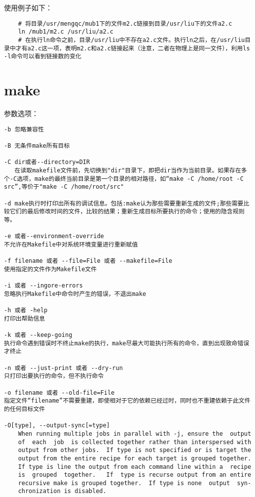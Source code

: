 \documentclass[a4paper,left=2.5cm,right=2.5cm,11pt]{article}
\begin{document}
	使用例子如下：
	\begin{lstlisting}
	# 将目录/usr/mengqc/mub1下的文件m2.c链接到目录/usr/liu下的文件a2.c
	ln /mub1/m2.c /usr/liu/a2.c
	# 在执行ln命令之前，目录/usr/liu中不存在a2.c文件。执行ln之后，在/usr/liu目录中才有a2.c这一项，表明m2.c和a2.c链接起来（注意，二者在物理上是同一文件），利用ls -l命令可以看到链接数的变化
	\end{lstlisting}

\section{make}
	参数选项：
	\begin{lstlisting}
-b 忽略兼容性 

-B 无条件make所有目标 

-C dir或者--directory=DIR 
   在读取makefile文件前，先切换到"dir"目录下，即把dir当作为当前目录。如果存在多个-C选项，make的最终当前目录是第一个目录的相对路径，如“make -C /home/root -C src”,等价于"make -C /home/root/src" 

-d make执行时打印出所有的调试信息。包括:make认为那些需要重新生成的文件;那些需要比较它们的最后修改时间的文件，比较的结果；重新生成目标所要执行的命令；使用的隐含规则等。 

-e 或者--environment-override 
不允许在Makefile中对系统环境变量进行重新赋值 

-f filename 或者 --file=File 或者 --makefile=File 
使用指定的文件作为Makefile文件 

-i 或者 --ingore-errors 
忽略执行Makefile中命令时产生的错误，不退出make 

-h 或者 -help 
打印出帮助信息 

-k 或者 --keep-going 
执行命令遇到错误时不终止make的执行，make尽最大可能执行所有的命令，直到出现致命错误才终止 

-n 或者 --just-print 或者 --dry-run 
只打印出要执行的命令，但不执行命令 

-o filename 或者 --old-file=File 
指定文件“filename”不需要重建，即使相对于它的依赖已经过时，同时也不重建依赖于此文件的任何目标文件 

-O[type], --output-sync[=type]
	When running multiple jobs in parallel with -j, ensure the  output
	of  each  job  is collected together rather than interspersed with
	output from other jobs.  If type is not specified or is target the
	output from the entire recipe for each target is grouped together.
	If type is line the output from each command line within a  recipe
	is  grouped  together.   If  type is recurse output from an entire
	recursive make is grouped together.  If type is none  output  syn‐
	chronization is disabled.


\end{lstlisting}
\end{document}
